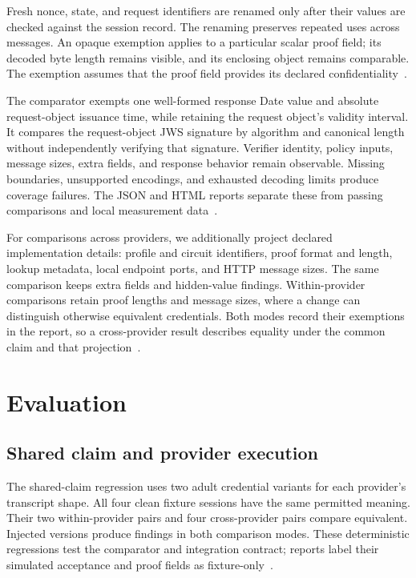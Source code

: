 \documentclass[10pt,twocolumn,letterpaper]{article}
\begin{document}
Fresh nonce, state, and request identifiers are renamed only after their values are checked against the session record. The renaming preserves repeated uses across messages. An opaque exemption applies to a particular scalar proof field; its decoded byte length remains visible, and its enclosing object remains comparable. The exemption assumes that the proof field provides its declared confidentiality~\cite{artifact}.

The comparator exempts one well-formed response Date value and absolute request-object issuance time, while retaining the request object's validity interval. It compares the request-object JWS signature by algorithm and canonical length without independently verifying that signature. Verifier identity, policy inputs, message sizes, extra fields, and response behavior remain observable. Missing boundaries, unsupported encodings, and exhausted decoding limits produce coverage failures. The JSON and HTML reports separate these from passing comparisons and local measurement data~\cite{artifact}.

For comparisons across providers, we additionally project declared implementation details: profile and circuit identifiers, proof format and length, lookup metadata, local endpoint ports, and HTTP message sizes. The same comparison keeps extra fields and hidden-value findings. Within-provider comparisons retain proof lengths and message sizes, where a change can distinguish otherwise equivalent credentials. Both modes record their exemptions in the report, so a cross-provider result describes equality under the common claim and that projection~\cite{artifact}.

\section{Evaluation}
\subsection{Shared claim and provider execution}
The shared-claim regression uses two adult credential variants for each provider's transcript shape. All four clean fixture sessions have the same permitted meaning. Their two within-provider pairs and four cross-provider pairs compare equivalent. Injected versions produce findings in both comparison modes. These deterministic regressions test the comparator and integration contract; reports label their simulated acceptance and proof fields as fixture-only~\cite{artifact}.
\end{document}
